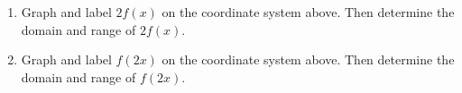 \begin{enumerate}
\begin{enumerate}
\begin{tikzpicture}[y=.5cm, x=0.5cm,font=\sffamily]
  \end{tikzpicture}

\vfill
\item Graph and label $2f(x)$ on the coordinate system above.  Then determine the domain and range of $2f(x)$.\vfill
\vfill

\item Graph and label $f(2x)$ on the coordinate system above.  Then determine the domain and range of $f(2x)$.\vfill
\vfill

\end{enumerate}






\end{enumerate}



